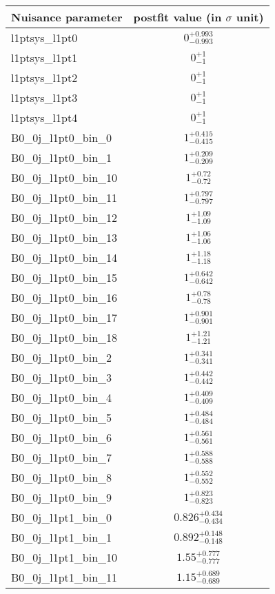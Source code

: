 
\begin{tabular}{|l|c|}
\hline
Nuisance parameter & postfit value (in $\sigma$ unit) \\\hline
l1ptsys\_l1pt0 & $0^{+0.993}_{-0.993}$ \\
l1ptsys\_l1pt1 & $0^{+1}_{-1}$ \\
l1ptsys\_l1pt2 & $0^{+1}_{-1}$ \\
l1ptsys\_l1pt3 & $0^{+1}_{-1}$ \\
l1ptsys\_l1pt4 & $0^{+1}_{-1}$ \\
B0\_0j\_l1pt0\_bin\_0 & $1^{+0.415}_{-0.415}$ \\
B0\_0j\_l1pt0\_bin\_1 & $1^{+0.209}_{-0.209}$ \\
B0\_0j\_l1pt0\_bin\_10 & $1^{+0.72}_{-0.72}$ \\
B0\_0j\_l1pt0\_bin\_11 & $1^{+0.797}_{-0.797}$ \\
B0\_0j\_l1pt0\_bin\_12 & $1^{+1.09}_{-1.09}$ \\
B0\_0j\_l1pt0\_bin\_13 & $1^{+1.06}_{-1.06}$ \\
B0\_0j\_l1pt0\_bin\_14 & $1^{+1.18}_{-1.18}$ \\
B0\_0j\_l1pt0\_bin\_15 & $1^{+0.642}_{-0.642}$ \\
B0\_0j\_l1pt0\_bin\_16 & $1^{+0.78}_{-0.78}$ \\
B0\_0j\_l1pt0\_bin\_17 & $1^{+0.901}_{-0.901}$ \\
B0\_0j\_l1pt0\_bin\_18 & $1^{+1.21}_{-1.21}$ \\
B0\_0j\_l1pt0\_bin\_2 & $1^{+0.341}_{-0.341}$ \\
B0\_0j\_l1pt0\_bin\_3 & $1^{+0.442}_{-0.442}$ \\
B0\_0j\_l1pt0\_bin\_4 & $1^{+0.409}_{-0.409}$ \\
B0\_0j\_l1pt0\_bin\_5 & $1^{+0.484}_{-0.484}$ \\
B0\_0j\_l1pt0\_bin\_6 & $1^{+0.561}_{-0.561}$ \\
B0\_0j\_l1pt0\_bin\_7 & $1^{+0.588}_{-0.588}$ \\
B0\_0j\_l1pt0\_bin\_8 & $1^{+0.552}_{-0.552}$ \\
B0\_0j\_l1pt0\_bin\_9 & $1^{+0.823}_{-0.823}$ \\
B0\_0j\_l1pt1\_bin\_0 & $0.826^{+0.434}_{-0.434}$ \\
B0\_0j\_l1pt1\_bin\_1 & $0.892^{+0.148}_{-0.148}$ \\
B0\_0j\_l1pt1\_bin\_10 & $1.55^{+0.777}_{-0.777}$ \\
B0\_0j\_l1pt1\_bin\_11 & $1.15^{+0.689}_{-0.689}$ \\

\end{tabular}
